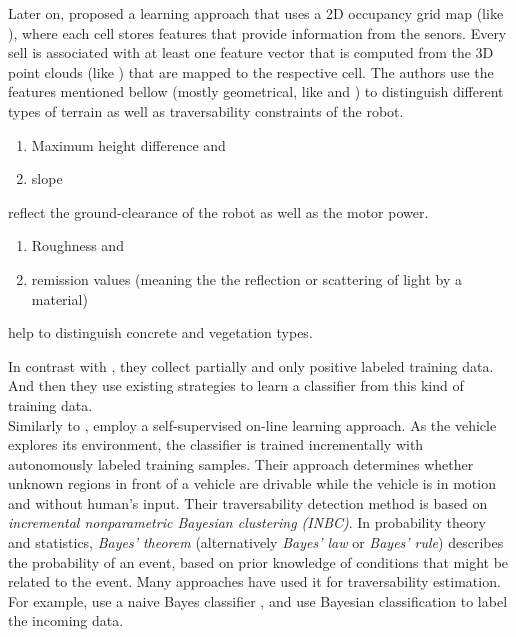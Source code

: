 \documentclass[12pt,a4paper]{report}
\newcommand{\term}{\textit}
\newcommand{\acronym}{\MakeUppercase}
\begin{document}
	Later on, \citet{Suger} proposed a learning approach that uses a \acronym{2d} 
	occupancy grid map (like \citet{Shneier}), where each cell stores features that 
	provide information from the senors. Every sell is associated with at least one 
	feature vector that is computed from the \acronym{3d} point clouds (like 
	\citet{Lalonde}) that are mapped to the respective cell. The authors use the 
	features mentioned bellow (mostly geometrical, like \citet{Lalonde} and 
	\citet{Pfaff}) to distinguish different types of terrain as well as 
	traversability constraints of the robot. 
	\begin{enumerate}
		\item Maximum height difference and
		\item slope 
	\end{enumerate}
	reflect the ground-clearance of the robot as well as the motor power.
	\begin{enumerate}
		\item Roughness and
		\item remission values (meaning the the reflection or scattering 
		of light by a material) 
	\end{enumerate}
	help to distinguish concrete and vegetation types.
	\par
	In contrast with \citet{Kim}, they collect partially and only positive labeled 
	training data. And then they use existing strategies \citep{Denis, Elkan} to 
	learn a classifier from this kind of training data.
	\\
	
	Similarly to \citet{Kim}, \citet{Lee} employ a self-supervised on-line learning 
	approach. As the vehicle explores its environment, the classifier is trained 
	incrementally with autonomously labeled training samples. Their approach 
	determines whether unknown regions in front of a vehicle are drivable while the 
	vehicle is in motion and without human’s input. Their traversability detection 
	method is based on \term{incremental nonparametric Bayesian clustering 
	(\acronym{inbc})}. In probability theory and statistics, \term{Bayes' theorem} 
	(alternatively \term{Bayes' law} or \term{Bayes' rule}) describes the probability 
	of an event, based on prior knowledge of conditions that might be related to the 
	event. Many approaches have used it for traversability estimation. For example, 
	\citet{Suger} use a naive Bayes classifier \citep{Denis}, and \citet{Lalonde} use 
	Bayesian classification to label the incoming data.
	\\
	
\end{document}
